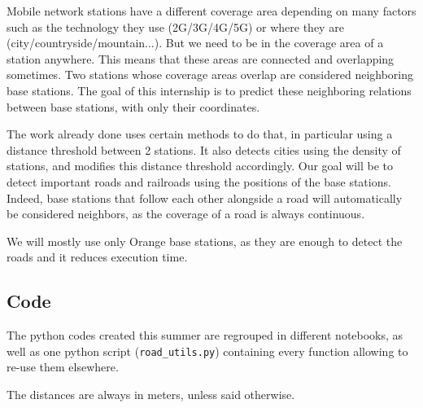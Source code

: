 \documentclass[main.tex]{subfiles}
\begin{document}
Mobile network stations have a different coverage area depending on many factors such as the technology they use (2G/3G/4G/5G) or where they are (city/countryside/mountain...). But we need to be in the coverage area of a station anywhere. This means that these areas are connected and overlapping sometimes. Two stations whose coverage areas overlap are considered neighboring base stations. The goal of this internship is to predict these neighboring relations between base stations, with only their coordinates. 

The work already done uses certain methods to do that, in particular using a distance threshold between 2 stations. It also detects cities using the density of stations, and modifies this distance threshold accordingly. Our goal will be to detect important roads and railroads using the positions of the base stations. Indeed, base stations that follow each other alongside a road will automatically be considered neighbors, as the coverage of a road is always continuous.

We will mostly use only Orange base stations, as they are enough to detect the roads and it reduces execution time. 

\subsection*{Code}

The python codes created this summer are regrouped in different notebooks, as well as one python script (\texttt{road\_utils.py}) containing every function allowing to re-use them elsewhere. 


The distances are always in meters, unless said otherwise.
\end{document}
